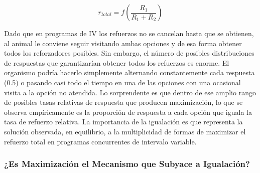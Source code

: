 \documentclass[
  letterpaper,
]{book}
\begin{document}
\[
r_{total}= f\left(\frac{R_1}{R_1 + R_2}\right)
\]

Dado que en programas de IV los refuerzos no se cancelan hasta que se
obtienen, al animal le conviene seguir visitando ambas opciones y de esa
forma obtener todos los reforzadores posibles. Sin embargo, el número de
posibles distribuciones de respuestas que garantizarían obtener todos
los refuerzos es enorme. El organismo podría hacerlo simplemente
alternando constantemente cada respuesta (0.5) o pasando casi todo el
tiempo en una de las opciones con una ocasional visita a la opción no
atendida. Lo sorprendente es que dentro de ese amplio rango de posibles
tasas relativas de respuesta que producen maximización, lo que se
observa empíricamente es la proporción de respuesta a cada opción que
iguala la tasa de refuerzo relativa. La importancia de la igualación es
que representa la solución observada, en equilibrio, a la multiplicidad
de formas de maximizar el refuerzo total en programas concurrentes de
intervalo variable.

\subsubsection{¿Es Maximización el Mecanismo que Subyace a
Igualación?}\label{es-maximizaciuxf3n-el-mecanismo-que-subyace-a-igualaciuxf3n}
\end{document}
